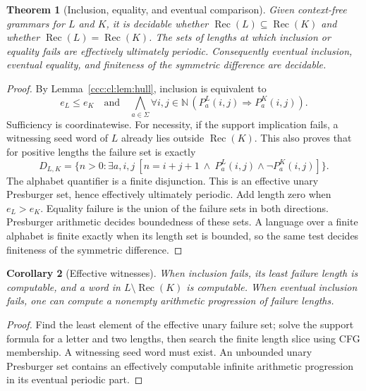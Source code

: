 \documentclass[11pt,letterpaper]{article}
\newtheorem{theorem}{Theorem}[section]
\newtheorem{corollary}[theorem]{Corollary}
\theoremstyle{definition}
\theoremstyle{remark}
\newcommand{\N}{\mathbb N}
\newcommand{\rec}{\operatorname{Rec}}
\begin{document}
\begin{theorem}[Inclusion, equality, and eventual comparison]\label{ccc:cl:thm:comparison}
Given context-free grammars for $L$ and $K$, it is decidable whether
$\rec(L)\subseteq\rec(K)$ and whether $\rec(L)=\rec(K)$.
The sets of lengths at which inclusion or equality fails are effectively
ultimately periodic. Consequently eventual inclusion, eventual equality,
and finiteness of the symmetric difference are decidable.
\end{theorem}
\begin{proof}
By Lemma~\ref{ccc:cl:lem:hull}, inclusion is equivalent to
\begin{equation}\label{ccc:cl:eq:inclusion}
 e_L\le e_K
 \quad\text{and}\quad
 \bigwedge_{a\in\Sigma}\forall i,j\in\N\,
       (P_a^L(i,j)\Rightarrow P_a^K(i,j)).
\end{equation}
Sufficiency is coordinatewise. For necessity, if the support implication
fails, a witnessing seed word of $L$ already lies outside $\rec(K)$.
This also proves that for positive lengths the failure set is exactly
\begin{equation}\label{ccc:cl:eq:badlength}
 D_{L,K}=\{n>0:\exists a,i,j\ [n=i+j+1\ \wedge\
                 P_a^L(i,j)\wedge\neg P_a^K(i,j)]\}.
\end{equation}
The alphabet quantifier is a finite disjunction. This is an effective unary
Presburger set, hence effectively ultimately periodic. Add length zero
when $e_L>e_K$. Equality failure is the union of the failure sets in both
directions. Presburger arithmetic decides boundedness of these sets.
A language over a finite alphabet is finite exactly when its length set is
bounded, so the same test decides finiteness of the symmetric difference.
\end{proof}

\begin{corollary}[Effective witnesses]
When inclusion fails, its least failure length is computable, and a word
in $L\setminus\rec(K)$ is computable. When eventual inclusion fails, one
can compute a nonempty arithmetic progression of failure lengths.
\end{corollary}
\begin{proof}
Find the least element of the effective unary failure set; solve the support
formula for a letter and two lengths, then search the finite length slice
using CFG membership. A witnessing seed word must exist. An unbounded
unary Presburger set contains an effectively computable infinite arithmetic
progression in its eventual periodic part.
\end{proof}
\end{document}
